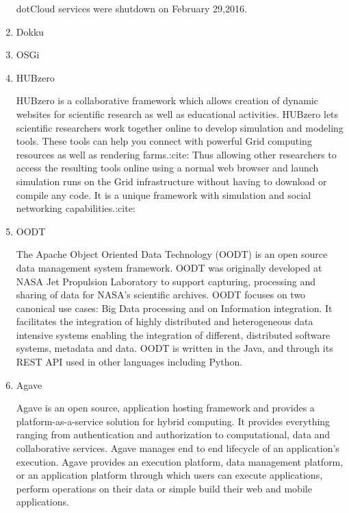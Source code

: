 \begin{enumerate}
dotCloud services were shutdown on February 29,2016.

\item {} 
Dokku

\item {} 
OSGi

\item {} 
HUBzero

HUBzero is a collaborative framework which allows creation of
dynamic websites for scientific research as well as educational
activities.  HUBzero lets scientific researchers work together
online to develop simulation and modeling tools.  These tools can
help you connect with powerful Grid computing resources as well
as rendering farms.:cite: Thus allowing other
researchers to access the resulting tools online using a normal
web browser and launch simulation runs on the Grid infrastructure
without having to download or compile any code. It is a unique
framework with simulation and social networking
capabilities.:cite:

\item {} 
OODT

The Apache Object Oriented Data Technology (OODT) is an open
source data management system framework. OODT was originally
developed at NASA Jet Propulsion Laboratory to support capturing,
processing and sharing of data for NASA's scientific
archives. OODT focuses on two canonical use cases: Big Data
processing and on Information integration. It facilitates the
integration of highly distributed and heterogeneous data
intensive systems enabling the integration of different,
distributed software systems, metadata and data. OODT is written
in the Java, and through its REST API used in other languages
including Python. \label{\detokenize{i524/technologies:id201}}{\hyperref[\detokenize{i524/technologies:www-oodt2}]{\sphinxcrossref{{[}173{]}}}}

\item {} 
Agave

Agave is an open source, application hosting framework and
provides a platform-as-a-service solution for hybrid
computing. \label{\detokenize{i524/technologies:id202}}{\hyperref[\detokenize{i524/technologies:agave-paper}]{\sphinxcrossref{{[}174{]}}}} It provides everything ranging
from authentication and authorization to computational, data and
collaborative services. Agave manages end to end lifecycle of an
application’s execution.  Agave provides an execution platform,
data management platform, or an application platform through
which users can execute applications, perform operations on their
data or simple build their web and mobile
applications. \label{\detokenize{i524/technologies:id203}}{\hyperref[\detokenize{i524/technologies:www-agaveapi-features}]{\sphinxcrossref{{[}175{]}}}}


\end{enumerate}

